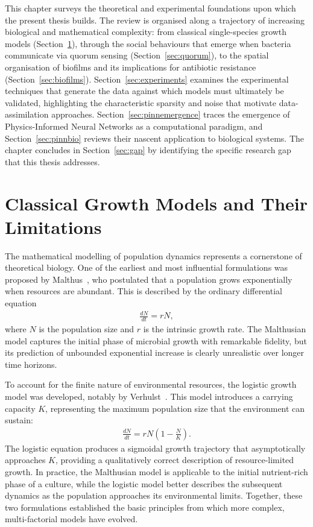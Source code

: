 \documentclass[14pt,a4paper,openany]{extbook}
\begin{document}
This chapter surveys the theoretical and experimental foundations upon which the present thesis builds. The review is organised along a trajectory of increasing biological and mathematical complexity: from classical single-species growth models (Section~\ref{sec:growthmodels}), through the social behaviours that emerge when bacteria communicate via quorum sensing (Section~\ref{sec:quorum}), to the spatial organisation of biofilms and its implications for antibiotic resistance (Section~\ref{sec:biofilms}). Section~\ref{sec:experiments} examines the experimental techniques that generate the data against which models must ultimately be validated, highlighting the characteristic sparsity and noise that motivate data-assimilation approaches. Section~\ref{sec:pinnemergence} traces the emergence of Physics-Informed Neural Networks as a computational paradigm, and Section~\ref{sec:pinnbio} reviews their nascent application to biological systems. The chapter concludes in Section~\ref{sec:gap} by identifying the specific research gap that this thesis addresses.

\section{Classical Growth Models and Their Limitations}
\label{sec:growthmodels}

The mathematical modelling of population dynamics represents a cornerstone of theoretical biology. One of the earliest and most influential formulations was proposed by Malthus~\cite{malthus1798essay}, who postulated that a population grows exponentially when resources are abundant. This is described by the ordinary differential equation
\begin{align}
    \frac{dN}{dt} = rN,
    \label{eq:malthus}
\end{align}
where $N$ is the population size and $r$ is the intrinsic growth rate. The Malthusian model captures the initial phase of microbial growth with remarkable fidelity, but its prediction of unbounded exponential increase is clearly unrealistic over longer time horizons.

To account for the finite nature of environmental resources, the logistic growth model was developed, notably by Verhulst~\cite{bacaer2011verhulst}. This model introduces a carrying capacity $K$, representing the maximum population size that the environment can sustain:
\begin{align}
    \frac{dN}{dt} = rN \left(1 - \frac{N}{K}\right).
    \label{eq:logistic}
\end{align}
The logistic equation produces a sigmoidal growth trajectory that asymptotically approaches $K$, providing a qualitatively correct description of resource-limited growth. In practice, the Malthusian model is applicable to the initial nutrient-rich phase of a culture, while the logistic model better describes the subsequent dynamics as the population approaches its environmental limits. Together, these two formulations established the basic principles from which more complex, multi-factorial models have evolved.
\end{document}
